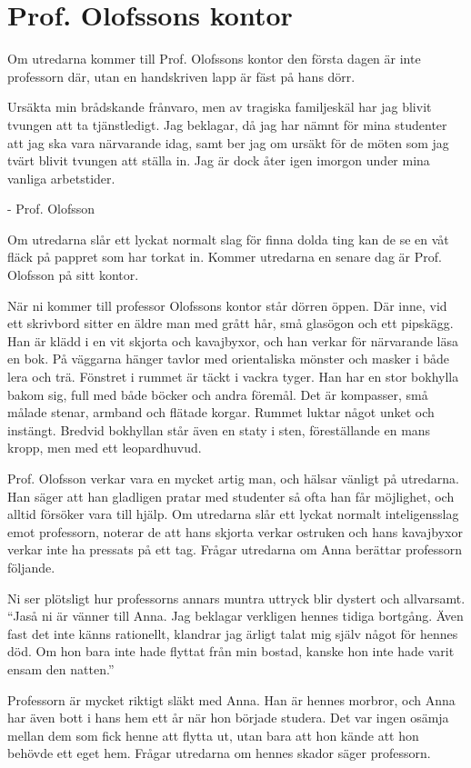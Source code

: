 \section{Prof. Olofssons kontor}
\label{loc:OlofssonsKontor}
%
Om utredarna kommer till Prof. Olofssons kontor den första dagen är inte professorn där, utan en handskriven lapp är fäst på hans dörr.

\begin{displayquote}
	Ursäkta min brådskande frånvaro, men av tragiska familjeskäl har jag blivit tvungen att ta tjänstledigt. Jag beklagar, då jag har nämnt för mina studenter att jag ska vara närvarande idag, samt ber jag om ursäkt för de möten som jag tvärt blivit tvungen att ställa in. Jag är dock åter igen imorgon under mina vanliga arbetstider.

	- Prof. Olofsson
\end{displayquote}
%
Om utredarna slår ett lyckat normalt slag för finna dolda ting kan de se en våt fläck på pappret som har torkat in. Kommer utredarna en senare dag är Prof. Olofsson på sitt kontor.

\begin{displayquote}
	När ni kommer till professor Olofssons kontor står dörren öppen. Där inne, vid ett skrivbord sitter en äldre man med grått hår, små glasögon och ett pipskägg. Han är klädd i en vit skjorta och kavajbyxor, och han verkar för närvarande läsa en bok. På väggarna hänger tavlor med orientaliska mönster och masker i både lera och trä. Fönstret i rummet är täckt i vackra tyger. Han har en stor bokhylla bakom sig, full med både böcker och andra föremål. Det är kompasser, små målade stenar, armband och flätade korgar. Rummet luktar något unket och instängt. Bredvid bokhyllan står även en staty i sten, föreställande en mans kropp, men med ett leopardhuvud.
\end{displayquote}
%
Prof. Olofsson \sectiondescribe{\ref{kar:TomasOlofsson}} verkar vara en mycket artig man, och hälsar vänligt på utredarna. Han säger att han gladligen pratar med studenter så ofta han får möjlighet, och alltid försöker vara till hjälp. Om utredarna slår ett lyckat normalt inteligensslag emot professorn, noterar de att hans skjorta verkar ostruken och hans kavajbyxor verkar inte ha pressats på ett tag. Frågar utredarna om Anna berättar professorn följande.

\begin{displayquote}
	Ni ser plötsligt hur professorns annars muntra uttryck blir dystert och allvarsamt.
	``Jaså ni är vänner till Anna. Jag beklagar verkligen hennes tidiga bortgång. Även fast det inte känns rationellt, klandrar jag ärligt talat mig själv något för hennes död. Om hon bara inte hade flyttat från min bostad, kanske hon inte hade varit ensam den natten.'' 
\end{displayquote}
%
Professorn är mycket riktigt släkt med Anna. Han är hennes morbror, och Anna har även bott i hans hem ett år när hon började studera. Det var ingen osämja mellan dem som fick henne att flytta ut, utan bara att hon kände att hon behövde ett eget hem. Frågar utredarna om hennes skador säger professorn.

